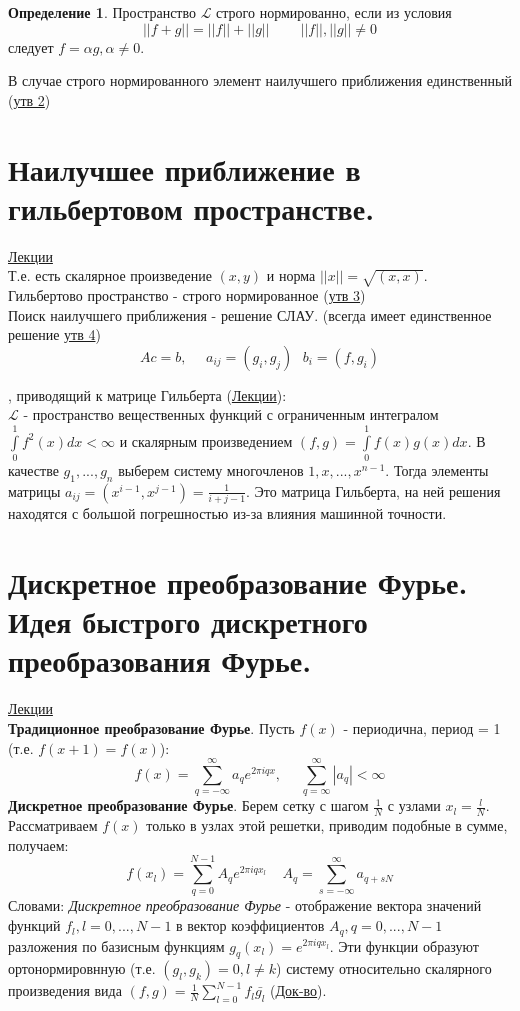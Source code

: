 \documentclass[specialist, subf, href, colorlinks=true, 12pt, times, mtpro, final]{disser}
\theoremstyle{definition}
\newtheorem{defn}{Определение}[section]
\begin{document}
    \begin{defn}  
        Пространство $\mathcal{L}$ строго нормированно, если из условия
        $$
            ||f+g|| = ||f||+||g|| \ \ \ \ \ \ \ \ \ \ ||f||,||g|| \ne 0
        $$
        следует $f = \alpha g, \alpha \ne 0$.
    \end{defn}

    В случае строго нормированного элемент наилучшего приближения единственный (\hyperlink {lects.29}{утв 2})

\section {Наилучшее приближение в гильбертовом пространстве.}
    \hyperlink {lects.29}{Лекции}\\
    Т.е. есть скалярное произведение $(x,y)$ и норма $||x||=\sqrt{(x,x)}$. \\
    Гильбертово пространство - строго нормированное (\hyperlink {lects.29}{утв 3}) \\
    
    Поиск наилучшего приближения - решение СЛАУ. (всегда имеет единственное решение \hyperlink {lects.30}{утв 4})
    $$
        Ac = b, \ \ \ \ \ \ a_{ij} = (g_i, g_j) \ \ \ b_i = (f, g_i)
    $$
    
    , приводящий к матрице Гильберта (\hyperlink{lects.31}{Лекции}):\\
    $\mathcal{L}$ - пространство вещественных функций с ограниченным интегралом $\int\limits_0^1 f^2(x)dx < \infty $ и скалярным произведением $(f,g) = \int\limits_0^1 f(x)g(x)dx$. В качестве $g_1, ..., g_n$ выберем систему многочленов $1, x, ..., x^{n-1}$. Тогда элементы матрицы $a_{ij} = (x^{i-1},x^{j-1}) = \frac{1}{i+j-1}$. Это матрица Гильберта, на ней решения находятся с большой погрешностью из-за влияния машинной точности. 

\section {Дискретное преобразование Фурье. Идея быстрого дискретного преобразования Фурье.}
    \hyperlink {lects.32}{Лекции}\\
    \textbf{Традиционное преобразование Фурье}. Пусть $f(x)$ - периодична, период = 1 (т.е. $f(x+1) = f(x)$):
    $$
        f(x) = \sum\limits_{q = -\infty}^{\infty} a_q e^{2\pi i qx},  \ \ \  \ \ \ \sum\limits_{q = \infty}^{\infty}|a_q| < \infty
    $$
    \textbf{Дискретное преобразование Фурье}. Берем сетку с шагом $\frac{1}{N}$ с узлами $x_l = \frac{l}{N}$. Рассматриваем $f(x)$ только в узлах этой решетки, приводим подобные в сумме, получаем:
    $$
        f(x_l) = \sum\limits_{q = 0}^{N-1} A_q e^{2\pi i qx_l} \ \ \ \ \ A_q = \sum\limits_{s = - \infty}^{\infty} a_{q+sN}
    $$
    Словами: \textit{Дискретное преобразование Фурье} - отображение вектора значений функций $f_l, l = 0, ..., N-1$ в вектор коэффициентов $A_q, q = 0, ..., N-1$ разложения по базисным функциям $g_q(x_l) = e^{2\pi i qx_l}$. Эти функции образуют ортонормировнную (т.е. $(g_l,g_k) = 0, l \ne k$) систему относительно скалярного произведения вида $(f,g) = \frac{1}{N}\sum\limits_{l = 0}^{N-1}f_l \bar{g_l}$ (\hyperlink {lects.32}{Док-во}). 
    
\end{document}

